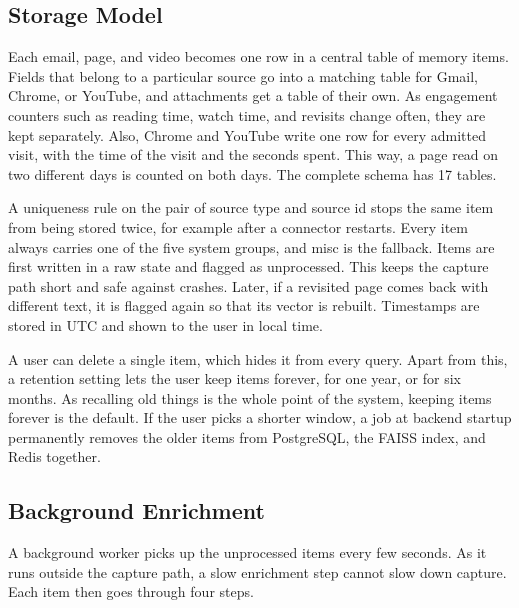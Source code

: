 \documentclass[conference]{IEEEtran}
\begin{document}
\subsection{Storage Model}
Each email, page, and video becomes one row in a central table of memory items. Fields that belong to a particular source go into a matching table for Gmail, Chrome, or YouTube, and attachments get a table of their own. As engagement counters such as reading time, watch time, and revisits change often, they are kept separately. Also, Chrome and YouTube write one row for every admitted visit, with the time of the visit and the seconds spent. This way, a page read on two different days is counted on both days. The complete schema has 17 tables.

A uniqueness rule on the pair of source type and source id stops the same item from being stored twice, for example after a connector restarts. Every item always carries one of the five system groups, and misc is the fallback. Items are first written in a raw state and flagged as unprocessed. This keeps the capture path short and safe against crashes. Later, if a revisited page comes back with different text, it is flagged again so that its vector is rebuilt. Timestamps are stored in UTC and shown to the user in local time.

A user can delete a single item, which hides it from every query. Apart from this, a retention setting lets the user keep items forever, for one year, or for six months. As recalling old things is the whole point of the system, keeping items forever is the default. If the user picks a shorter window, a job at backend startup permanently removes the older items from PostgreSQL, the FAISS index, and Redis together.

\subsection{Background Enrichment}
A background worker picks up the unprocessed items every few seconds. As it runs outside the capture path, a slow enrichment step cannot slow down capture. Each item then goes through four steps.
\end{document}
